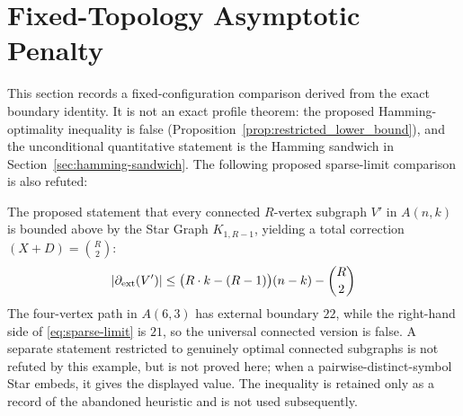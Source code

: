 \section{Fixed-Topology Asymptotic Penalty}\label{sec:sandwich}

This section records a fixed-configuration comparison derived from the exact
boundary identity. It is not an exact profile theorem: the proposed
Hamming-optimality inequality is false (Proposition~\ref{prop:restricted_lower_bound}),
and the unconditional quantitative statement is the Hamming sandwich in
Section~\ref{sec:hamming-sandwich}. The following proposed sparse-limit
comparison is also refuted:

\begin{remark}
The proposed statement that every connected $R$-vertex subgraph $V'$ in
$A(n,k)$ is bounded above by the Star Graph $K_{1, R-1}$, yielding a total
correction $(X+D) = \binom{R}{2}$:
	\begin{equation}\label{eq:sparse-limit}
		\left| \partial_{\mathrm{ext}}(V') \right| \le \big(R \cdot k - (R - 1)\big)(n - k) - \binom{R}{2}
	\end{equation}
The four-vertex path in $A(6,3)$ has external boundary $22$, while the
right-hand side of \eqref{eq:sparse-limit} is $21$, so the universal connected
version is false. A separate statement restricted to genuinely optimal
connected subgraphs is not refuted by this example, but is not proved here;
when a pairwise-distinct-symbol Star embeds, it gives the displayed value.
The inequality is retained only as a record of the abandoned heuristic and is
not used subsequently.
\end{remark}

